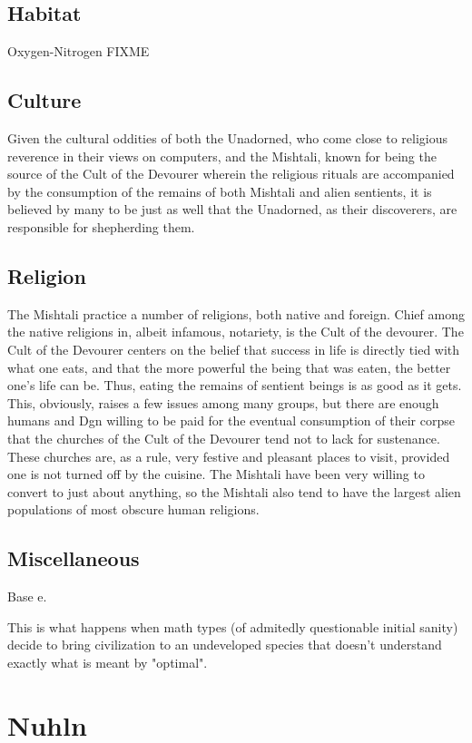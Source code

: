 \subsection{Habitat}
Oxygen-Nitrogen FIXME 

\subsection{Culture}
Given the cultural oddities of both the Unadorned, who come close to
religious reverence in their views on computers, and the Mishtali,
known for being the source of the Cult of the Devourer wherein the
religious rituals are accompanied by the consumption of the remains of
both Mishtali and alien sentients, it is believed by many to be just
as well that the Unadorned, as their discoverers, are responsible for
shepherding them.

\subsection{Religion}

The Mishtali practice a number of religions, both native and
foreign. Chief among the native religions in, albeit infamous,
notariety, is the Cult of the devourer. The Cult of the Devourer
centers on the belief that success in life is directly tied with what
one eats, and that the more powerful the being that was eaten, the
better one's life can be. Thus, eating the remains of sentient beings
is as good as it gets. This, obviously, raises a few issues among many
groups, but there are enough humans and Dgn willing to be paid for the
eventual consumption of their corpse that the churches of the Cult of
the Devourer tend not to lack for sustenance. These churches are, as a
rule, very festive and pleasant places to visit, provided one is not
turned off by the cuisine. The Mishtali have been very willing to
convert to just about anything, so the Mishtali also tend to have the
largest alien populations of most obscure human religions.

\subsection{Miscellaneous}
Base e.

This is what happens when math types (of admitedly questionable
initial sanity) decide to bring civilization to an undeveloped species
that doesn't understand exactly what is meant by "optimal".

\section{Nuhln}

